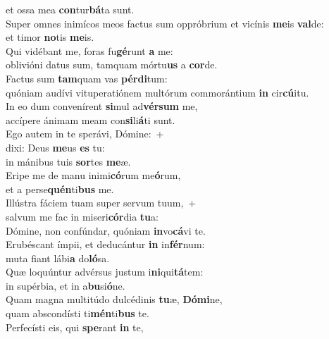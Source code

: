 \oddverse et ossa mea \textbf{con}tur\textbf{bá}ta sunt.\\
\evenverse Super omnes inimícos meos factus sum oppróbrium et vicínis \textbf{me}is \textbf{val}de:~\*\\
\evenverse et timor \textbf{no}tis \textbf{me}is.\\
\oddverse Qui vidébant me, foras fu\textbf{gé}runt \textbf{a} me:~\*\\
\oddverse oblivióni datus sum, tamquam mórtu\textbf{us} a \textbf{cor}de.\\
\evenverse Factus sum \textbf{tam}quam vas \textbf{pér}\textbf{di}tum:~\*\\
\evenverse quóniam audívi vituperatiónem multórum commorántium \textbf{in} cir\textbf{cú}itu.\\
\oddverse In eo dum convenírent \textbf{si}mul ad\textbf{vér}\textbf{sum} me,~\*\\
\oddverse accípere ánimam meam con\textbf{si}li\textbf{á}ti sunt.\\
\evenverse Ego autem in te sperávi, Dómine:~+\\
\evenverse  dixi: Deus \textbf{me}us \textbf{es} tu:~\*\\
\evenverse in mánibus tuis \textbf{sor}tes \textbf{me}æ.\\
\oddverse Eripe me de manu inimi\textbf{có}rum me\textbf{ó}rum,~\*\\
\oddverse et a perse\textbf{quén}ti\textbf{bus} me.\\
\evenverse Illústra fáciem tuam super servum tuum,~+\\
\evenverse  salvum me fac in miseri\textbf{cór}dia \textbf{tu}a:~\*\\
\evenverse Dómine, non confúndar, quóniam \textbf{in}vo\textbf{cá}vi te.\\
\oddverse Erubéscant ímpii, et deducántur \textbf{in} in\textbf{fér}num:~\*\\
\oddverse muta fiant lábi\textbf{a} do\textbf{ló}sa.\\
\evenverse Quæ loquúntur advérsus justum i\textbf{ni}qui\textbf{tá}tem:~\*\\
\evenverse in supérbia, et in a\textbf{bu}si\textbf{ó}ne.\\
\oddverse Quam magna multitúdo dulcédinis \textbf{tu}æ, \textbf{Dó}\textbf{mi}ne,~\*\\
\oddverse quam abscondísti ti\textbf{mén}ti\textbf{bus} te.\\
\evenverse Perfecísti eis, qui \textbf{spe}rant \textbf{in} te,~\*\\
